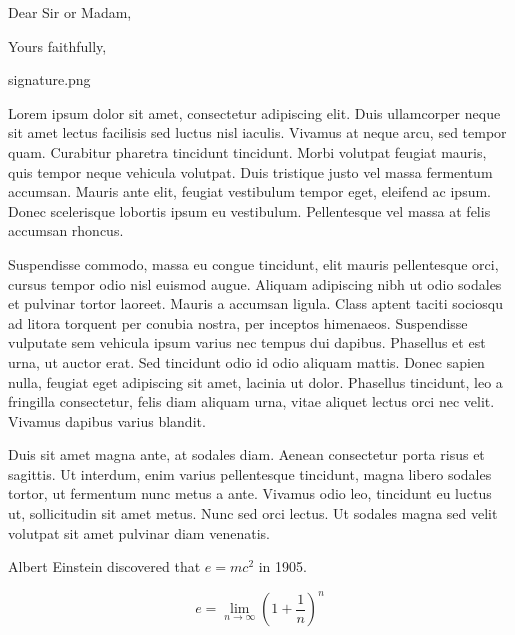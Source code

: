 \documentclass[10pt,a4paper,roman]{moderncv}        %
\begin{document}
\clearpage
\date{January 01, 1984}
\subject{Job application}
\opening{Dear Sir or Madam,}
\closing{Yours faithfully,}
\signature{0.9}{signature.png}                     %
\makelettertitle

Lorem ipsum dolor sit amet, consectetur adipiscing elit. Duis ullamcorper neque sit amet lectus facilisis sed luctus nisl iaculis. Vivamus at neque arcu, sed tempor quam. Curabitur pharetra tincidunt tincidunt. Morbi volutpat feugiat mauris, quis tempor neque vehicula volutpat. Duis tristique justo vel massa fermentum accumsan. Mauris ante elit, feugiat vestibulum tempor eget, eleifend ac ipsum. Donec scelerisque lobortis ipsum eu vestibulum. Pellentesque vel massa at felis accumsan rhoncus.

Suspendisse commodo, massa eu congue tincidunt, elit mauris pellentesque orci, cursus tempor odio nisl euismod augue. Aliquam adipiscing nibh ut odio sodales et pulvinar tortor laoreet. Mauris a accumsan ligula. Class aptent taciti sociosqu ad litora torquent per conubia nostra, per inceptos himenaeos. Suspendisse vulputate sem vehicula ipsum varius nec tempus dui dapibus. Phasellus et est urna, ut auctor erat. Sed tincidunt odio id odio aliquam mattis. Donec sapien nulla, feugiat eget adipiscing sit amet, lacinia ut dolor. Phasellus tincidunt, leo a fringilla consectetur, felis diam aliquam urna, vitae aliquet lectus orci nec velit. Vivamus dapibus varius blandit.

Duis sit amet magna ante, at sodales diam. Aenean consectetur porta risus et sagittis. Ut interdum, enim varius pellentesque tincidunt, magna libero sodales tortor, ut fermentum nunc metus a ante. Vivamus odio leo, tincidunt eu luctus ut, sollicitudin sit amet metus. Nunc sed orci lectus. Ut sodales magna sed velit volutpat sit amet pulvinar diam venenatis.

Albert Einstein discovered that $e=mc^2$ in 1905.

\[ e=\lim_{n \to \infty} \left(1+\frac{1}{n}\right)^n \]

\makeletterclosing

\end{document}
